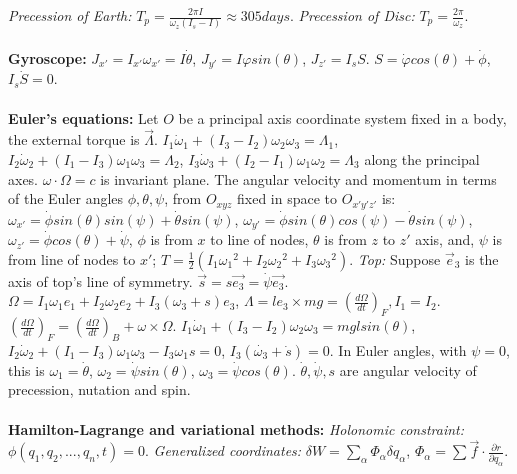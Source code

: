 \emph{Precession of Earth:}
$T_p= {\frac {2 \pi I} {\omega_z (I_s-I)}} \approx 305 days$.
\emph{Precession of Disc:}
$T_p= {\frac {2 \pi} {\omega_z }}$.
\\
\\
{\bf Gyroscope: }
$J_{x'}= I_{x'} \omega_{x'}= I {\dot {\theta}}$,
$J_{y'}= I \varphi sin ( \theta )$,
$J_{z'}= I_s S$.
$S= {\dot {\varphi}} cos( \theta ) + {\dot {\phi}}$,
$I_s {\dot S}=0$.
\\
\\
{\bf Euler's equations:} Let $O$ be a principal axis coordinate system fixed
in a body, the external torque is $\vec {\Lambda}$.
$I_1 {\dot{\omega}}_1 + (I_3 - I_2) \omega_2 \omega_3 = \Lambda_1$,
$I_2 {\dot{\omega}}_2 + (I_1 - I_3) \omega_1 \omega_3 = \Lambda_2$,
$I_3 {\dot{\omega}}_3 + (I_2 - I_1) \omega_1 \omega_2 = \Lambda_3$ along
the principal axes.
$\omega \cdot \Omega=c$ is invariant plane. The angular velocity and momentum in
terms of the Euler angles $\phi,\theta, \psi$, from $O_{xyz}$ fixed in space
to $O_{x'y'z'}$ is:
$\omega_{x'}= \dot{\phi} sin( \theta ) sin ( \psi ) + \dot { \theta} sin ( \psi )$,
$\omega_{y'}= \dot{\phi} sin( \theta ) cos ( \psi ) - \dot { \theta} sin ( \psi )$,
$\omega_{z'}= \dot{\phi} cos( \theta ) + \dot { \psi }$, $\phi$ is from $x$ to line of
nodes, 
$\theta$ is from $z$ to $z'$ axis, and, 
$\psi$ is from line of nodes to $x'$;
$T= {\frac 1 2}(I_1 {\omega_1}^2+ I_2 {\omega_2}^2 + I_3 {\omega_3}^2)$.
\emph{Top:}  Suppose $\vec{e}_3$ is the axis of top's line of symmetry.
$\vec{s}= s\vec{e_3}= \dot {\psi} \vec{e_3}$.
$\Omega= I_1 \omega_1 e_1 + I_2 \omega_2 e_2 + I_3 (\omega_3 +s) e_3$, 
$\Lambda= l e_3 \times mg= ({\frac {d \Omega} {dt}})_F, I_1=I_2$.
$ ({\frac {d \Omega} {dt}})_F= ({\frac {d \Omega} {dt}})_B + \omega \times \Omega$.
$I_1 {\dot{\omega}}_1 + (I_3 - I_2) \omega_2 \omega_3 = mgl sin ( \theta )$, 
$I_2 {\dot{\omega}}_2 + (I_1 - I_3) \omega_1 \omega_3 - I_3 \omega_1 s= 0$,
$I_3 (\dot{\omega_3} + \dot{s})= 0$. In Euler angles, with $\psi=0$, this is
$\omega_1= \dot{\theta}$, $\omega_2= \dot{\psi} sin (\theta )$,
$\omega_3= \dot{\psi} cos ( \theta )$. $\dot{\theta},\dot{\psi}, s$ are angular velocity
of precession, nutation and spin.
\\
\\
{\bf Hamilton-Lagrange and variational methods:}
\emph{Holonomic constraint:} $\phi(q_1 , q_2 , ... ,q_n , t)=0$.  \emph{Generalized
coordinates:}
$\delta W= \sum_{\alpha} \Phi_{\alpha} \delta q_{\alpha}$,
$\Phi_{\alpha} =
\sum \vec{f} \cdot {\frac {\partial r} {\partial q_{\alpha}}}$.  
